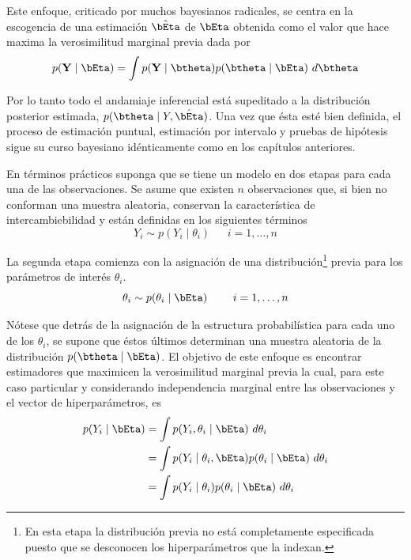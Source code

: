Este enfoque, criticado por muchos bayesianos radicales, se centra en la escogencia de una estimación $\hat{\bEta}$ de $\bEta$ obtenida como el valor que hace maxima la verosimilitud marginal previa dada por
\begin{align}\label{ecua1}
p(\mathbf{Y} \mid \bEta)=\int p(\mathbf{Y} \mid \btheta)p(\btheta \mid \bEta) \ d\btheta
\end{align}

Por lo tanto todo el andamiaje inferencial está supeditado a la distribución posterior estimada, $p(\btheta \mid Y,\hat{\bEta})$. Una vez que ésta esté bien definida, el proceso de estimación puntual, estimación por intervalo y pruebas de hipótesis sigue su curso bayesiano idénticamente como en los capítulos anteriores.

En términos prácticos suponga que se tiene un modelo en dos etapas para cada una de las observaciones. Se asume que existen $n$ observaciones que, si bien no conforman una muestra aleatoria, conservan la característica de intercambiebilidad y están definidas en los siguientes términos
\begin{equation*}
Y_i \sim p(Y_i \mid \theta_i) \ \ \ \ \ \ \ i=1,\ldots,n
\end{equation*}

La segunda etapa comienza con la asignación de una distribución\footnote{En esta etapa la distribución previa no está completamente especificada puesto que se desconocen los hiperparámetros que la indexan.} previa para los parámetros de interés $\theta_i$.
\begin{equation*}
\theta_i \sim p(\theta_i \mid \bEta) \ \ \ \ \ \ \ i=1,\ldots,n
\end{equation*}

Nótese que detrás de la asignación de la estructura probabilística para cada uno de los $\theta_i$, se supone que éstos últimos determinan una muestra aleatoria de la distribución $p(\btheta \mid \bEta)$.
El objetivo de este enfoque es encontrar estimadores que maximicen la verosimilitud marginal previa la cual, para este caso particular y considerando independencia marginal entre las observaciones y el vector de hiperparámetros, es
\begin{align}
p(Y_i \mid \bEta)&=\int p(Y_i,\theta_i \mid \bEta) \ d\theta_i \notag \\
&=\int p(Y_i \mid \theta_i,\bEta)p(\theta_i \mid \bEta) \ d\theta_i \notag \\
&=\int p(Y_i \mid \theta_i)p(\theta_i \mid \bEta) \ d\theta_i
\end{align}

